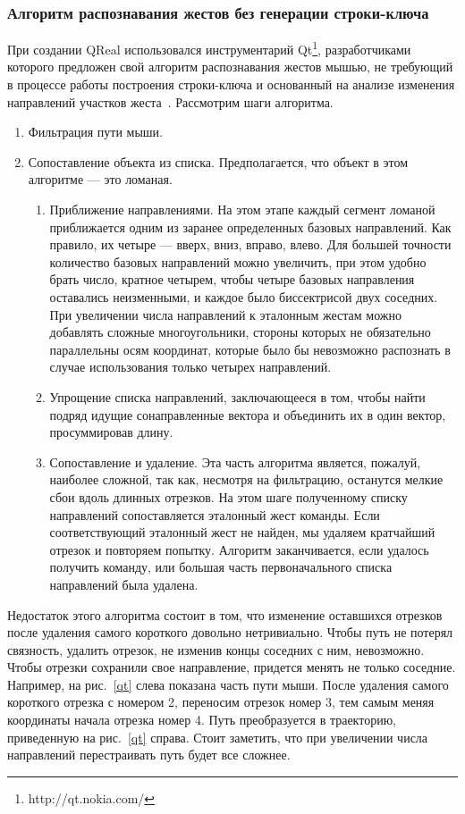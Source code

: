 \documentclass[a5paper]{article}
\begin{document}
\subsubsection{Алгоритм распознавания жестов без генерации строки-ключа}
\label{qtAlgorithm}
При создании QReal использовался инструментарий Qt\footnote{http://qt.nokia.com/}, разработчиками которого предложен свой алгоритм распознавания жестов мышью, не требующий в процессе работы построения строки-ключа и основанный на анализе изменения направлений участков жеста~\cite{qtGestures}. Рассмотрим шаги алгоритма.
\begin{enumerate}
  \item Фильтрация пути мыши.
  \item Сопоставление объекта из списка. Предполагается, что объект в этом алгоритме --- это ломаная.
  \begin{enumerate}
    \item Приближение направлениями. На этом этапе каждый сегмент ломаной приближается одним из заранее определенных базовых направлений. Как правило, их четыре --- вверх, вниз, вправо, влево. Для большей точности количество базовых направлений можно увеличить, при этом удобно брать число, кратное четырем, чтобы четыре базовых направления оставались неизменными, и каждое было биссектрисой двух соседних. При увеличении числа направлений к эталонным жестам можно добавлять сложные многоугольники, стороны которых не обязательно параллельны осям координат, которые было бы невозможно распознать в случае использования только четырех направлений.
    \item Упрощение списка направлений, заключающееся в том, чтобы найти подряд идущие сонаправленные вектора и объединить их в один вектор, просуммировав длину.
    \item Сопоставление и удаление. Эта часть алгоритма является, пожалуй, наиболее сложной, так как, несмотря на фильтрацию, останутся мелкие сбои вдоль длинных отрезков. На этом шаге полученному списку направлений сопоставляется эталонный жест команды. Если соответствующий эталонный жест не найден, мы удаляем кратчайший отрезок и повторяем попытку. Алгоритм заканчивается, если удалось получить команду, или большая часть первоначального списка направлений была удалена.
  \end{enumerate}
\end{enumerate}

Недостаток этого алгоритма состоит в том, что изменение оставшихся отрезков после удаления самого короткого довольно нетривиально. Чтобы путь не потерял связность, удалить отрезок, не изменив концы соседних с ним, невозможно. Чтобы отрезки сохранили свое направление, придется менять не только соседние. Например, на рис.~\ref{qt} слева показана часть пути мыши. После удаления самого короткого отрезка с номером 2, переносим отрезок номер 3, тем самым меняя координаты начала отрезка номер 4. Путь преобразуется в траекторию, приведенную на рис.~\ref{qt} справа. Стоит заметить, что при увеличении числа направлений перестраивать путь будет все сложнее. 
\end{document}
